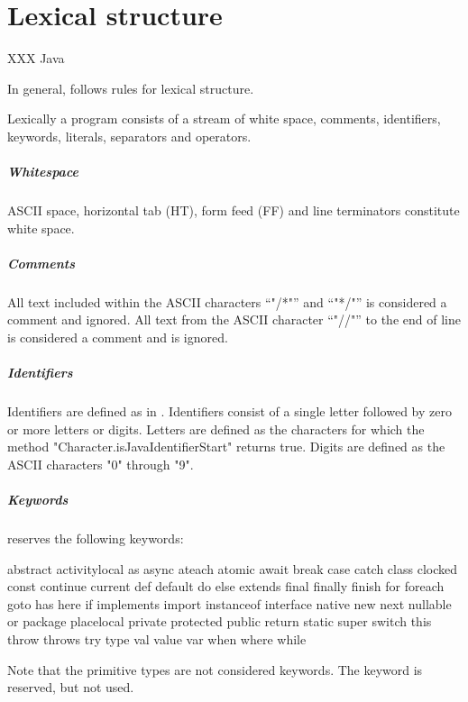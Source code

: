 \chapter{Lexical structure}

XXX Java

In general, \Xten{} follows \java{} rules \cite[Chapter 3]{jls2} for
lexical structure.

Lexically a program consists of a stream of white space, comments,
identifiers, keywords, literals, separators and operators.

\paragraph{Whitespace}
ASCII space, horizontal tab (HT), form feed (FF) and line terminators constitute white space.


\paragraph{Comments}
All text included within the ASCII characters ``\xcd"/*"'' and
``\xcd"*/"'' is
considered a comment and ignored. All text from the ASCII character
``\xcd"//"'' to the end of line is considered a comment and is ignored.

\paragraph{Identifiers}

Identifiers  are defined as in \java.
Identifiers consist of a single letter followed by zero or more
letters or digits.
Letters are defined as the characters for which the \java{}
method \xcd"Character.isJavaIdentifierStart" returns true.
Digits are defined as the ASCII characters \xcd"0" through \xcd"9".

\paragraph{Keywords}
\Xten{} reserves the following keywords:
\begin{xten}
abstract        activitylocal   as              async
ateach          atomic          await           break
case            catch           class           clocked
const           continue        current         def
default         do              else            extends
final           finally         finish          for
foreach         goto            has             here
if              implements      import          instanceof
interface       native          new             next
nullable        or              package         placelocal
private         protected       public          return
static          super           switch          this
throw           throws          try             type
val             value           var             when
where           while
\end{xten}
Note that the primitive types are not considered keywords.
The keyword  is reserved, but not used.

